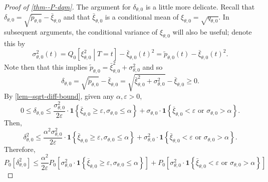 \documentclass[12pt]{article}
\let\Cref\autoref
\theoremstyle{definition}
\theoremstyle{plain}
\begin{document}
\begin{proof}[Proof of \Cref{thm--P-dqm}]
The argument for \(\delta_{\theta, 0}\) is a little more delicate.
Recall that \(\delta_{\theta, 0} = \sqrt{\tilde{p}_{\theta, 0}} -
\bar{\xi}_{\theta, 0}\) and that
\(\bar{\xi}_{\theta, 0}\) is a conditional mean of \(\xi_{\theta, 0} =
\sqrt{q_{\theta, 0}}\).
In subsequent arguments, the conditional variance of \(\xi_{\theta, 0}\) will
also be useful; denote this by
\begin{equation*}
  \sigma_{\theta, 0}^{2} (t) = Q_{0} \left[ \xi_{\theta, 0}^{2} \middle| T = t
  \right] - \bar{\xi}_{\theta, 0} (t)^{2} = \tilde{p}_{\theta, 0} (t) -
  \bar{\xi}_{\theta, 0} (t)^{2}.
\end{equation*}
Note then that this implies \(\tilde{p}_{\theta, 0} = \bar{\xi}_{\theta, 0}^{2}
+ \sigma_{\theta, 0}^{2}\) and so
\begin{equation*}
  \delta_{\theta, 0} = \sqrt{\tilde{p}_{\theta, 0}} - \bar{\xi}_{\theta, 0} =
  \sqrt{\bar{\xi}_{\theta, 0}^{2} + \sigma_{\theta, 0}^{2}} - \bar{\xi}_{\theta,
  0} \geq 0.
\end{equation*}
By \Cref{lem--sqrt-diff-bound}, given any \(\alpha, \varepsilon > 0\),
\begin{equation*}
  0 \leq \delta_{\theta, 0} \leq \frac{\sigma_{\theta, 0}^{2}}{2 \varepsilon}
  \cdot \mathbf{1} \left\{ \bar{\xi}_{\theta, 0} \geq \varepsilon,
  \sigma_{\theta, 0} \leq \alpha \right\} +
  \sigma_{\theta, 0} \cdot \mathbf{1} \left\{ \bar{\xi}_{\theta, 0} <
  \varepsilon \text{ or } \sigma_{\theta, 0} > \alpha \right\}.
\end{equation*}
Then,
\begin{equation*}
  \delta_{\theta, 0}^{2} \leq \frac{\alpha^{2} \sigma_{\theta, 0}^{2}}{2
  \varepsilon} \cdot \mathbf{1} \left\{ \bar{\xi}_{\theta, 0} \geq \varepsilon,
  \sigma_{\theta, 0} \leq \alpha \right\} +
  \sigma_{\theta, 0}^{2} \cdot \mathbf{1} \left\{ \bar{\xi}_{\theta, 0} <
  \varepsilon \text{ or } \sigma_{\theta, 0} > \alpha \right\}.
\end{equation*}
Therefore,
\begin{equation}
  P_{0} \left[ \delta_{\theta, 0}^{2} \right] \leq \frac{\alpha^{2}}{2
  \varepsilon} P_{0} \left[ \sigma_{\theta, 0}^{2} \cdot \mathbf{1} \left\{
  \bar{\xi}_{\theta, 0} \geq \varepsilon, \sigma_{\theta, 0} \leq \alpha
  \right\} \right] + P_{0} \left[ \sigma_{\theta, 0}^{2} \cdot \mathbf{1}
  \left\{ \bar{\xi}_{\theta, 0} < \varepsilon \text{ or } \sigma_{\theta, 0} >
  \alpha \right\} \right]
  \label{eqn--Edelta2-bound-1}
\end{equation}


\end{proof}
\end{document}
